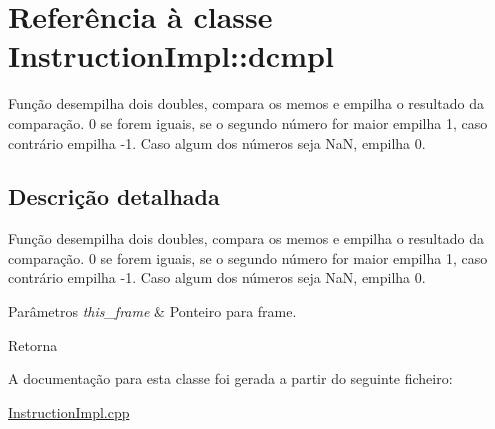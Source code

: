 \hypertarget{class_instruction_impl_1_1dcmpl}{}\section{Referência à classe Instruction\+Impl\+:\+:dcmpl}
\label{class_instruction_impl_1_1dcmpl}


Função desempilha dois doubles, compara os memos e empilha o resultado da comparação. 0 se forem iguais, se o segundo número for maior empilha 1, caso contrário empilha -\/1. Caso algum dos números seja NaN, empilha 0.  




\subsection{Descrição detalhada}
Função desempilha dois doubles, compara os memos e empilha o resultado da comparação. 0 se forem iguais, se o segundo número for maior empilha 1, caso contrário empilha -\/1. Caso algum dos números seja NaN, empilha 0. 


\begin{DoxyParams}{Parâmetros}
{\em this\+\_\+frame} & Ponteiro para frame. \\
\hline
\end{DoxyParams}
\begin{DoxyReturn}{Retorna}

\end{DoxyReturn}


A documentação para esta classe foi gerada a partir do seguinte ficheiro\+:\begin{DoxyCompactItemize}
\item 
\hyperlink{_instruction_impl_8cpp}{Instruction\+Impl.\+cpp}\end{DoxyCompactItemize}
